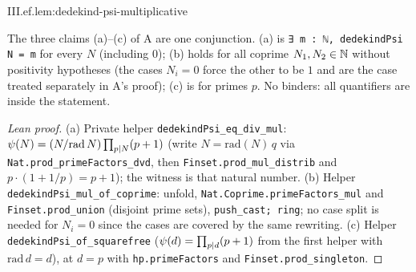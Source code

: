 \begin{lemma}
\end{lemma}
\begin{tfformal}{III.ef.lem:dedekind-psi-multiplicative}
\begin{tffidelity}
The three claims (a)--(c) of A are one conjunction. (a) is \texttt{∃ m : ℕ, dedekindPsi N = m} for every $N$ (including $0$); (b) holds for all coprime $N_1,N_2\in\mathbb{N}$ without positivity hypotheses (the cases $N_i=0$ force the other to be $1$ and are the case treated separately in A's proof); (c) is for primes $p$. No binders: all quantifiers are inside the statement.
\end{tffidelity}
\end{tfformal}
\begin{proof}[Lean proof]
(a) Private helper \texttt{dedekindPsi\_eq\_div\_mul}: $\psi(N)=(N/\mathrm{rad}\,N)\prod_{p\mid N}(p+1)$ (write $N=\mathrm{rad}(N)\,q$ via \texttt{Nat.prod\_primeFactors\_dvd}, then \texttt{Finset.prod\_mul\_distrib} and $p\cdot(1+1/p)=p+1$); the witness is that natural number. (b) Helper \texttt{dedekindPsi\_mul\_of\_coprime}: unfold, \texttt{Nat.Coprime.primeFactors\_mul} and \texttt{Finset.prod\_union} (disjoint prime sets), \texttt{push\_cast; ring}; no case split is needed for $N_i=0$ since the cases are covered by the same rewriting. (c) Helper \texttt{dedekindPsi\_of\_squarefree} ($\psi(d)=\prod_{p\mid d}(p+1)$ from the first helper with $\mathrm{rad}\,d=d$), at $d=p$ with \texttt{hp.primeFactors} and \texttt{Finset.prod\_singleton}.
\end{proof}

